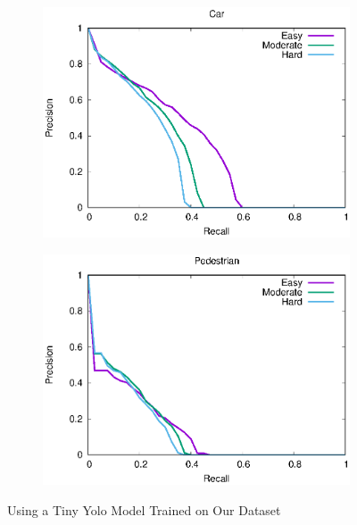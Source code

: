 \begin{figure}[H]
\begin{subfigure}{.5\textwidth}
    \centering
    \includegraphics[width=1.0\linewidth]{img/yolo_Nov_9/plot_valid/car_detection.eps}
\end{subfigure}%
\begin{subfigure}{.5\textwidth}
    \centering
    \includegraphics[width=1.0\linewidth]{img/yolo_Nov_9/plot_valid/pedestrian_detection.eps}
\end{subfigure}
\caption{Using a Tiny Yolo Model Trained on Our Dataset}
\end{figure}


